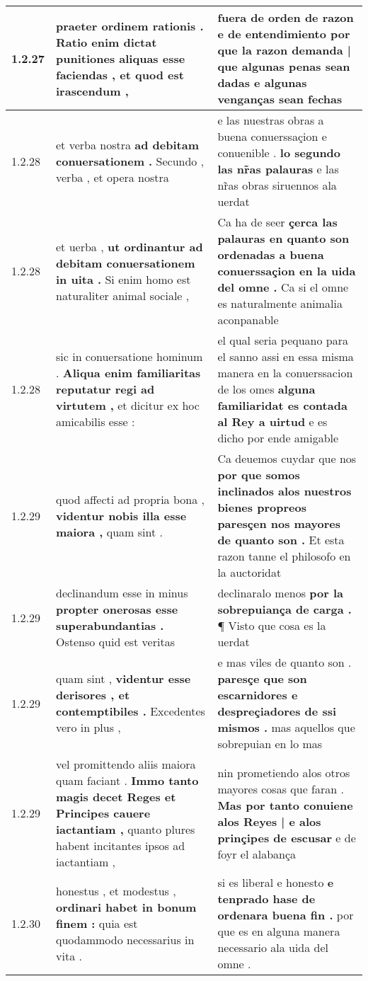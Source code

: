 \begin{tabular}{|p{1cm}|p{6.5cm}|p{6.5cm}|}
1.2.27 & praeter ordinem rationis . \textbf{ Ratio enim dictat punitiones aliquas esse faciendas , } et quod est irascendum , & fuera de orden de razon e de entendimiento \textbf{ por que la razon demanda | que algunas penas sean dadas } e algunas venganças sean fechas \\\hline
1.2.28 & et verba nostra \textbf{ ad debitam conuersationem . } Secundo , verba , et opera nostra & e las nuestras obras a buena conuerssaçion e conuenible . \textbf{ lo segundo las nr̃as palauras } e las nr̃as obras siruennos ala uerdat \\\hline
1.2.28 & et uerba , \textbf{ ut ordinantur ad debitam conuersationem in uita . } Si enim homo est naturaliter animal sociale , & Ca ha de seer \textbf{ çerca las palauras en quanto son ordenadas a buena conuerssaçion en la uida del omne . } Ca si el omne es naturalmente animalia aconpanable \\\hline
1.2.28 & sic in conuersatione hominum . \textbf{ Aliqua enim familiaritas reputatur regi ad virtutem , } et dicitur ex hoc amicabilis esse : & el qual seria pequano para el sanno assi en essa misma manera en la conuerssacion de los omes \textbf{ alguna familiaridat es contada al Rey a uirtud } e es dicho por ende amigable \\\hline
1.2.29 & quod affecti ad propria bona , \textbf{ videntur nobis illa esse maiora , } quam sint . & Ca deuemos cuydar que nos \textbf{ por que somos inclinados alos nuestros bienes propreos paresçen nos mayores de quanto son . } Et esta razon tanne el philosofo en la auctoridat \\\hline
1.2.29 & declinandum esse in minus \textbf{ propter onerosas esse superabundantias . } Ostenso quid est veritas & declinaralo menos \textbf{ por la sobrepuiança de carga . } ¶ Visto que cosa es la uerdat \\\hline
1.2.29 & quam sint , \textbf{ videntur esse derisores , et contemptibiles . } Excedentes vero in plus , & e mas viles de quanto son . \textbf{ paresçe que son escarnidores e despreçiadores de ssi mismos . } mas aquellos que sobrepuian en lo mas \\\hline
1.2.29 & vel promittendo aliis maiora quam faciant . \textbf{ Immo tanto magis decet Reges et Principes cauere iactantiam , } quanto plures habent incitantes ipsos ad iactantiam , & nin prometiendo alos otros mayores cosas que faran . \textbf{ Mas por tanto conuiene alos Reyes | e alos prinçipes de escusar } e de foyr el alabança \\\hline
1.2.30 & honestus , et modestus , \textbf{ ordinari habet in bonum finem : } quia est quodammodo necessarius in vita . & si es liberal e honesto \textbf{ e tenprado hase de ordenara buena fin . } por que es en alguna manera necessario ala uida del omne . \\\hline

\end{tabular}
